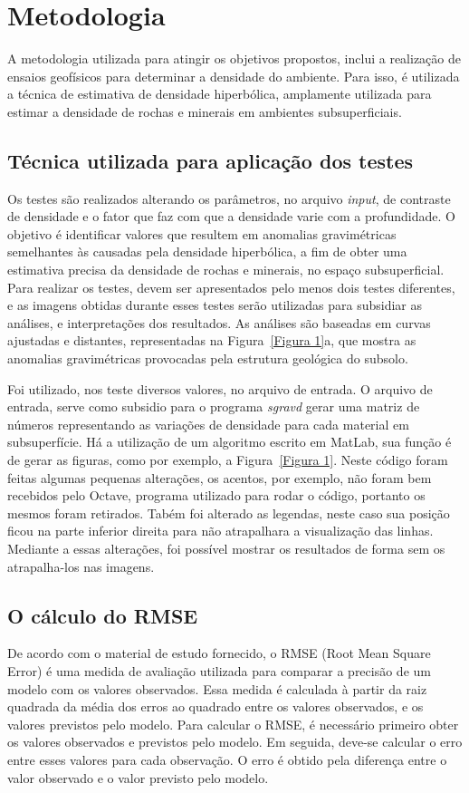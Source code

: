 \section{Metodologia}
A metodologia utilizada para atingir os objetivos propostos, inclui a realização de ensaios geofísicos para determinar a densidade do ambiente. Para isso, é utilizada a técnica de estimativa de densidade hiperbólica, amplamente utilizada para estimar a densidade de rochas e minerais em ambientes subsuperficiais.

\subsection{Técnica utilizada para aplicação dos testes}
Os testes são realizados alterando os parâmetros, no arquivo \textit{input}, de contraste de densidade e o fator que faz com que a densidade varie com a profundidade. O objetivo é identificar valores que resultem em anomalias gravimétricas semelhantes às causadas pela densidade hiperbólica, a fim de obter uma estimativa precisa da densidade de rochas e minerais, no espaço subsuperficial. Para realizar os testes, devem ser apresentados pelo menos dois testes diferentes, e as imagens obtidas durante esses testes serão utilizadas para subsidiar as análises, e interpretações dos resultados. As análises são baseadas em curvas ajustadas e distantes, representadas na Figura~\ref{Figura 1}a, que mostra as anomalias gravimétricas provocadas pela estrutura geológica do subsolo. 

Foi utilizado, nos teste diversos valores, no arquivo de entrada. O arquivo de entrada, serve como subsidio para o programa \textit{sgravd} gerar uma matriz de números representando as variações de densidade para cada material em subsuperfície. Há a utilização de um algoritmo escrito em MatLab, sua função é de gerar as figuras, como por exemplo, a Figura~\ref{Figura 1}. Neste código foram feitas algumas pequenas alterações, os acentos, por exemplo, não foram bem recebidos pelo Octave, programa utilizado para rodar o código, portanto os mesmos foram retirados. Tabém foi alterado as legendas, neste caso sua posição ficou na parte inferior direita para não atrapalhara a visualização das linhas. Mediante a essas alterações, foi possível mostrar os resultados de forma sem os atrapalha-los nas imagens.

\subsection{O cálculo do RMSE}
De acordo com o material de estudo fornecido, o RMSE (Root Mean Square Error) é uma medida de avaliação utilizada para comparar a precisão de um modelo com os valores observados. Essa medida é calculada à partir da raiz quadrada da média dos erros ao quadrado entre os valores observados, e os valores previstos pelo modelo. Para calcular o RMSE, é necessário primeiro obter os valores observados e previstos pelo modelo. Em seguida, deve-se calcular o erro entre esses valores para cada observação. O erro é obtido pela diferença entre o valor observado e o valor previsto pelo modelo.



